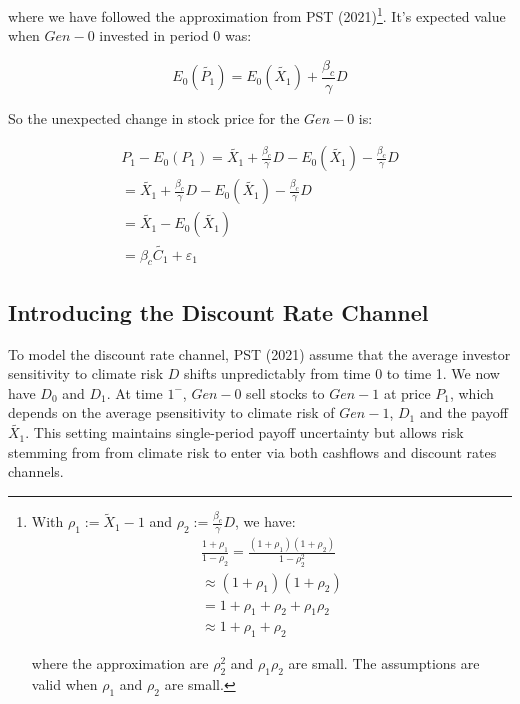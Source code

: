 where we have followed the approximation
from PST (2021)\footnote{
With $\rho_1 := \tilde{X}_1 - 1$ and $\rho_2 := \frac{\beta_{c}}{\gamma}D$,
we have:
\begin{equation}
    \begin{aligned}
        \frac{1 + \rho_1}{1 - \rho_2} = \frac{(1 + \rho_1)(1 + \rho_2)}{1 - \rho_2^2} \\
        \approx (1 + \rho_1)(1 + \rho_2) \\
        = 1 + \rho_1 + \rho_2 + \rho_1 \rho_2 \\
        \approx 1 + \rho_1 + \rho_2
    \end{aligned}
\end{equation}

where the approximation are $\rho^2_2$ and $\rho_1 \rho_2$ are small.
The assumptions are valid when $\rho_1$ and $\rho_2$ are small.
}.
It's expected value when $Gen-0$ invested in period 0 was:

\begin{equation}
    E_0(\tilde{P_1}) = E_0(\tilde{X_1}) + \frac{\beta_{c}}{\gamma}D
\end{equation}

So the unexpected change in stock price 
for the $Gen-0$ is:

\begin{equation}
    \begin{aligned}
    P_1 - E_0(P_1) = \tilde{X_1} + \frac{\beta_{c}}{\gamma}D - E_0(\tilde{X_1}) - \frac{\beta_{c}}{\gamma}D \\
    = \tilde{X_1} + \frac{\beta_{c}}{\gamma}D - E_0(\tilde{X_1}) - \frac{\beta_{c}}{\gamma}D \\
    = \tilde{X_1} - E_0(\tilde{X_1}) \\
    = \beta_{c} \tilde{C_1} + \varepsilon_1
    \end{aligned}
\end{equation}

\subsection{Introducing the Discount Rate Channel}

To model the discount rate channel, PST (2021)
assume that the average investor sensitivity to climate risk 
$D$ shifts unpredictably from time 0 
to time 1. We now have $D_0$ and $D_1$.
At time $1^{-}$, $Gen-0$ sell stocks 
to $Gen-1$ at price $P_1$, which depends 
on the average psensitivity to climate risk
of $Gen-1$, $D_1$ and the payoff $\tilde{X_1}$.
This setting maintains single-period 
payoff uncertainty but allows risk
stemming from from climate risk to enter 
via both cashflows and discount rates 
channels.

